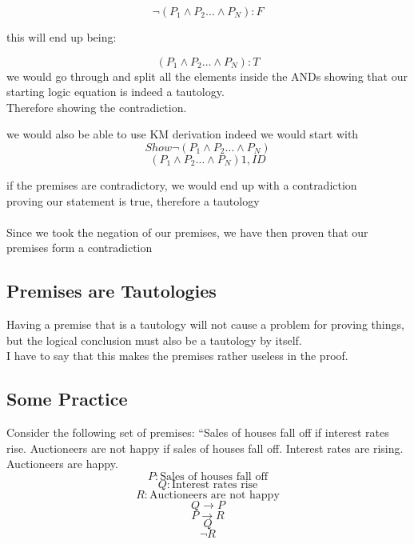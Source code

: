\documentclass[a4paper,12pt]{article}
\begin{document}
  \[ \lnot ( P_{1} \wedge P_{2} \dots \wedge P_{N}) : F \]

this will end up being:

  \[ ( P_{1} \wedge P_{2} \dots \wedge P_{N}) : T\]
  we would go through and split all the elements inside the ANDs
  showing that our starting logic equation is indeed a tautology.\\
  Therefore showing the contradiction.\\

\bigskip

we would also be able to use KM derivation
indeed we would start with
  \[ Show \lnot ( P_{1} \wedge P_{2} \dots \wedge P_{N}) \]
  \[( P_{1} \wedge P_{2} \dots \wedge P_{N}) 1,ID\] 
  
if the premises are contradictory, we would end up with a contradiction\\
proving our statement is true, therefore a tautology\\
\bigskip\\
Since we took the negation of our premises, we have then proven that our premises form a contradiction\\

\subsection{Premises are Tautologies}
Having a premise that is a tautology will not cause a problem for proving things, but the logical conclusion must also be a tautology by itself.\\
I have to say that this makes the premises rather useless in the proof.\\
\subsection{Some Practice}
Consider the following set of premises: ``Sales of houses fall off if interest rates rise. Auctioneers are not happy if sales of houses fall off. Interest rates are rising. Auctioneers are happy.
\[
P: \text{Sales of houses fall off} 
\]
\[
Q: \text{Interest rates rise}
\]
\[
R: \text{Auctioneers are not happy}
\]
\begin{equation} 
Q\rightarrow P 
\end{equation}
\begin{equation} 
P \rightarrow R
\end{equation}
\begin{equation} 
Q
\end{equation}
\begin{equation} 
\lnot R
\end{equation}
\end{document}
